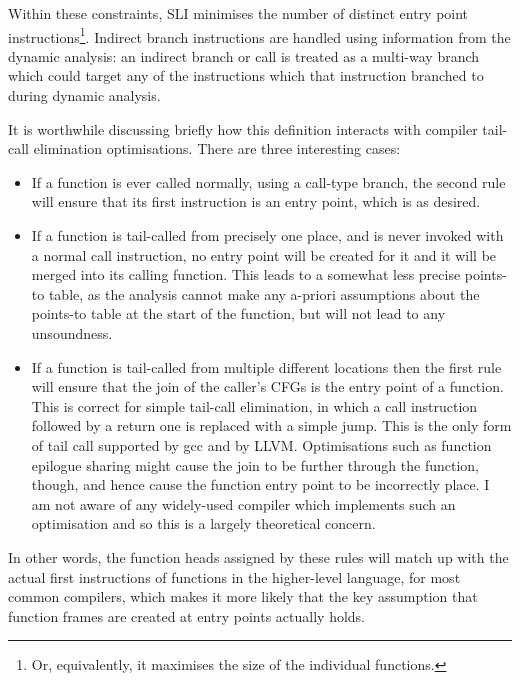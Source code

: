 Within these constraints, SLI minimises the number of distinct entry
point instructions\footnote{Or, equivalently, it maximises the size of
  the individual functions.}.
Indirect branch instructions are handled using information from the
dynamic analysis: an indirect branch or call is treated as a multi-way
branch which could target any of the instructions which that
instruction branched to during dynamic analysis.

It is worthwhile discussing briefly how this definition interacts with
compiler tail-call elimination optimisations.  There are three
interesting cases:

\begin{itemize}
\item
  If a function is ever called normally, using a call-type branch, the
  second rule will ensure that its first instruction is an entry
  point, which is as desired.
\item
  If a function is tail-called from precisely one place, and is never
  invoked with a normal call instruction, no entry point will be
  created for it and it will be merged into its calling function.
  This leads to a somewhat less precise points-to table, as the
  analysis cannot make any a-priori assumptions about the points-to
  table at the start of the function, but will not lead to any
  unsoundness.
\item
  If a function is tail-called from multiple different locations then
  the first rule will ensure that the join of the caller's CFGs is the
  entry point of a function.  This is correct for simple tail-call
  elimination, in which a call instruction followed by a return one is
  replaced with a simple jump.  This is the only form of tail call
  supported by gcc and by LLVM.  Optimisations such as function epilogue
  sharing\needCite{} might cause the join to be further through the
  function, though, and hence cause the function entry point to be
  incorrectly place.  I am not aware of any widely-used compiler which
  implements such an optimisation and so this is a largely theoretical
  concern.
\end{itemize}

In other words, the function heads assigned by these rules will match
up with the actual first instructions of functions in the higher-level
language, for most common compilers, which makes it more likely that
the key assumption that function frames are created at entry points
actually holds.

